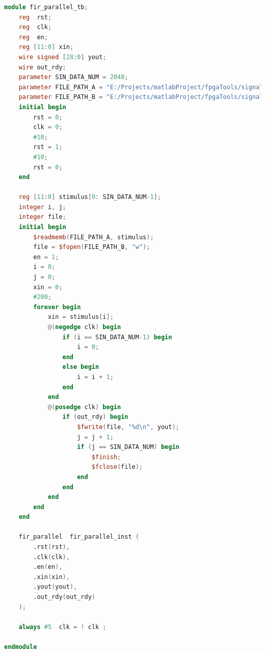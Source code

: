 \documentclass{article}
\begin{document}
\begin{lstlisting}[language=Verilog, caption={8阶FIR滤波器仿真文件}]
module fir_parallel_tb;
    reg  rst;
    reg  clk;
    reg  en;
    reg [11:0] xin;
    wire signed [28:0] yout;
    wire out_rdy;
    parameter SIN_DATA_NUM = 2048;
    parameter FILE_PATH_A = "E:/Projects/matlabProject/fpgaTools/signal_data.txt";
    parameter FILE_PATH_B = "E:/Projects/matlabProject/fpgaTools/signal_res.txt";   
    initial begin
        rst = 0;
        clk = 0;
        #10;
        rst = 1;
        #10;
        rst = 0;
    end

    reg [11:0] stimulus[0: SIN_DATA_NUM-1];
    integer i, j;
    integer file;
    initial begin
        $readmemb(FILE_PATH_A, stimulus);
        file = $fopen(FILE_PATH_B, "w");
        en = 1;
        i = 0;
        j = 0;
        xin = 0;
        #200;
        forever begin
            xin = stimulus[i];
            @(negedge clk) begin
                if (i == SIN_DATA_NUM-1) begin
                    i = 0;
                end
                else begin
                    i = i + 1;
                end
            end
            @(posedge clk) begin
                if (out_rdy) begin
                    $fwrite(file, "%d\n", yout);
                    j = j + 1;
                    if (j == SIN_DATA_NUM) begin
                        $finish;
                        $fclose(file);
                    end
                end
            end
        end
    end
   
    fir_parallel  fir_parallel_inst (
        .rst(rst),
        .clk(clk),
        .en(en),
        .xin(xin),
        .yout(yout),
        .out_rdy(out_rdy)
    );

    always #5  clk = ! clk ;

endmodule
\end{lstlisting}
\end{document}
